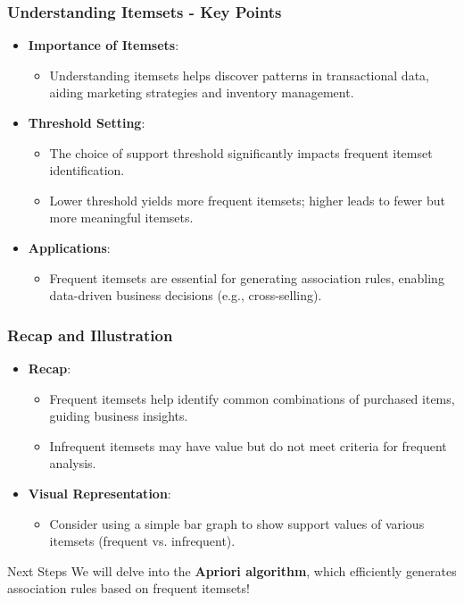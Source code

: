 \documentclass[aspectratio=169]{beamer}
\begin{document}
\begin{frame}[fragile]
    \frametitle{Understanding Itemsets - Key Points}
    \begin{itemize}
        \item \textbf{Importance of Itemsets}: 
        \begin{itemize}
            \item Understanding itemsets helps discover patterns in transactional data, aiding marketing strategies and inventory management.
        \end{itemize}

        \item \textbf{Threshold Setting}: 
        \begin{itemize}
            \item The choice of support threshold significantly impacts frequent itemset identification.
            \item Lower threshold yields more frequent itemsets; higher leads to fewer but more meaningful itemsets.
        \end{itemize}

        \item \textbf{Applications}:
        \begin{itemize}
            \item Frequent itemsets are essential for generating association rules, enabling data-driven business decisions (e.g., cross-selling).
        \end{itemize}
    \end{itemize}
\end{frame}

\begin{frame}[fragile]
    \frametitle{Recap and Illustration}
    \begin{itemize}
        \item \textbf{Recap}:
        \begin{itemize}
            \item Frequent itemsets help identify common combinations of purchased items, guiding business insights.
            \item Infrequent itemsets may have value but do not meet criteria for frequent analysis.
        \end{itemize}

        \item \textbf{Visual Representation}:
        \begin{itemize}
            \item Consider using a simple bar graph to show support values of various itemsets (frequent vs. infrequent).
        \end{itemize}
    \end{itemize}

    \begin{block}{Next Steps}
        We will delve into the \textbf{Apriori algorithm}, which efficiently generates association rules based on frequent itemsets!
    \end{block}
\end{frame}
\end{document}
